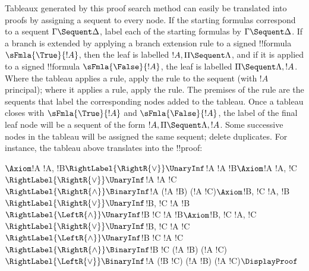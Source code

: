 \documentclass[../../../include/open-logic-section]{subfiles}
\begin{document}
Tableaux generated by this proof search method can easily be
translated into  proofs by assigning a sequent to every node.
If the starting formulas correspond to a sequent $\Gamma \Sequent
\Delta$, label each of the starting formulas by $\Gamma \Sequent
\Delta$. If a branch is extended by applying a branch extension rule
to a signed !!{formula} $\sFmla{\True}{!A}$, then the leaf is
labelled $!A, \Pi \Sequent \Lambda$, and if it is applied to a signed
!!{formula} $\sFmla{\False}{!A}$, the leaf is labelled $\Pi \Sequent
\Lambda, !A$. Where the tableau applies a \TRule{\True}{\star} rule,
apply the \LeftR{\star} rule to the sequent (with $!A$ principal);
where it applies a \TRule{\False}{\star} rule, apply the \RightR{\star}
rule. The premises of the rule are the sequents that label the
corresponding nodes added to the tableau. Once a tableau closes with
$\sFmla{\True}{!A}$ and $\sFmla{\False}{!A}$, the label of the final
leaf node will be a sequent of the form $!A, \Pi \Sequent \Lambda,
!A$. Some successive nodes in the tableau will be assigned the same
sequent; delete duplicates. For instance, the tableau above translates
into the !!{proof}:

\begin{maxwidth}
$
\Axiom$!A \fCenter !A, !B$
\RightLabel{\RightR{\lor}}
\UnaryInf$!A \fCenter !A \lor !B$
\Axiom$!A \fCenter !A, !C$
\RightLabel{\RightR{\lor}}
\UnaryInf$!A \fCenter !A \lor !C$
\RightLabel{\RightR{\land}}
\BinaryInf$!A \fCenter (!A \lor !B) \land (!A \lor !C)$
\Axiom$!B, !C \fCenter !A, !B$
\RightLabel{\RightR{\lor}}
\UnaryInf$!B, !C \fCenter !A \lor !B$
\RightLabel{\LeftR{\land}}
\UnaryInf$!B \land !C \fCenter !A \lor !B$
\Axiom$!B, !C \fCenter !A, !C$
\RightLabel{\RightR{\lor}}
\UnaryInf$!B, !C \fCenter !A \lor !C$
\RightLabel{\LeftR{\land}}
\UnaryInf$!B \land !C \fCenter !A \lor !C$
\RightLabel{\RightR{\land}}
\BinaryInf$!B \land !C \fCenter (!A \lor !B) \land
(!A \lor !C)$
\RightLabel{\LeftR{\lor}}
\BinaryInf$!A \lor (!B \land !C) \fCenter (!A \lor !B) \land
(!A \lor !C)$
\DisplayProof$
\end{maxwidth}
\end{document}
